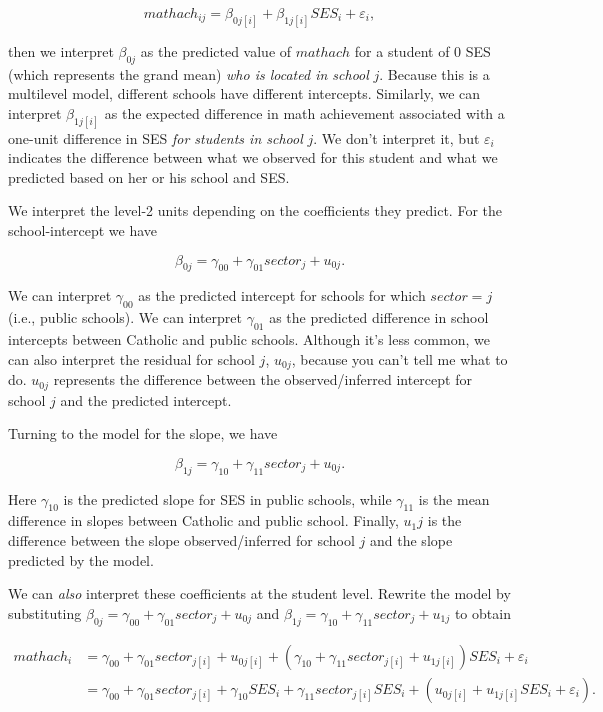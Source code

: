 \documentclass[
  letterpaper,
  DIV=11,
  numbers=noendperiod]{scrreprt}
\begin{document}
\[mathach_{ij} = \beta_{0j[i]} + \beta_{1j[i]}SES_i + \varepsilon_i,\]

then we interpret \(\beta_{0j}\) as the predicted value of \(mathach\)
for a student of 0 SES (which represents the grand mean) \emph{who is
located in school} \(j\). Because this is a multilevel model, different
schools have different intercepts. Similarly, we can interpret
\(\beta_{1j[i]}\) as the expected difference in math achievement
associated with a one-unit difference in SES \emph{for students in
school} \(j\). We don't interpret it, but \(\varepsilon_i\) indicates
the difference between what we observed for this student and what we
predicted based on her or his school and SES.

We interpret the level-2 units depending on the coefficients they
predict. For the school-intercept we have

\[\beta_{0j} = \gamma_{00} + \gamma_{01}sector_j + u_{0j}.\]

We can interpret \(\gamma_{00}\) as the predicted intercept for schools
for which \(sector = j\) (i.e., public schools). We can interpret
\(\gamma_{01}\) as the predicted difference in school intercepts between
Catholic and public schools. Although it's less common, we can also
interpret the residual for school \(j\), \(u_{0j}\), because you can't
tell me what to do. \(u_{0j}\) represents the difference between the
observed/inferred intercept for school \(j\) and the predicted
intercept.

Turning to the model for the slope, we have

\[\beta_{1j} = \gamma_{10} + \gamma_{11}sector_j + u_{0j}.\]

Here \(\gamma_{10}\) is the predicted slope for SES in public schools,
while \(\gamma_{11}\) is the mean difference in slopes between Catholic
and public school. Finally, \(u_1j\) is the difference between the slope
observed/inferred for school \(j\) and the slope predicted by the model.

We can \emph{also} interpret these coefficients at the student level.
Rewrite the model by substituting
\(\beta_{0j} = \gamma_{00} + \gamma_{01}sector_j + u_{0j}\) and
\(\beta_{1j} = \gamma_{10} + \gamma_{11}sector_j + u_{1j}\) to obtain

\[\begin{aligned}
mathach_i &= \gamma_{00} + \gamma_{01}sector_{j[i]} + u_{0j[i]} + (\gamma_{10} + \gamma_{11}sector_{j[i]} + u_{1j[i]})SES_i + \varepsilon_i \\
&= \gamma_{00} + \gamma_{01}sector_{j[i]} + \gamma_{10}SES_i + \gamma_{11}sector_{j[i]}SES_i + (u_{0j[i]} + u_{1j[i]}SES_i + \varepsilon_i).
\end{aligned}\]
\end{document}
